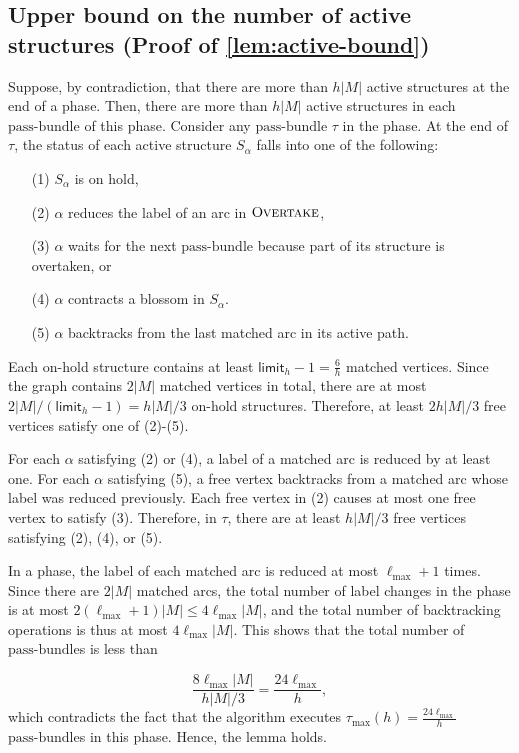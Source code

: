 \documentclass{article}
\newcommand{\alp}{\alpha}
\newcommand{\lmax}{\ell_{\max}}
\newcommand{\taumax}{\tau_{\max}}
\newcommand{\bundle}{\text{pass-bundle}\xspace}
\newcommand{\limit}{\mathsf{limit}}
\newcommand{\algOvertake}{\textsc{Overtake}\xspace}
\begin{document}
\subsection{Upper bound on the number of active structures (Proof of \cref{lem:active-bound})}
\label{sec:proof-active-bound}
Suppose, by contradiction, that there are more than $h|M|$ active structures at the end of a phase.
Then, there are more than $h|M|$ active structures in each $\bundle$ of this phase.
Consider any $\bundle$ $\tau$ in the phase.
At the end of $\tau$, the status of each active structure $S_\alp$ falls into one of the following:
\begin{itemize}
    \item[(1)] $S_\alp$ is on hold,
    \item[(2)] $\alp$ reduces the label of an arc in $\algOvertake$,
    \item[(3)] $\alp$ waits for the next $\bundle$ because part of its structure is overtaken, or
    \item[(4)] $\alp$ contracts a blossom in $S_\alp$.
    \item[(5)] $\alp$ backtracks from the last matched arc in its active path.
\end{itemize}
Each on-hold structure contains at least $\limit_h - 1 = \frac{6}{h}$ matched vertices.
Since the graph contains $2|M|$ matched vertices in total, there are at most $2|M|/(\limit_h - 1) = h|M|/3$ on-hold structures.
Therefore, at least $2h|M|/3$ free vertices satisfy one of (2)-(5).

For each $\alp$ satisfying (2) or (4), a label of a matched arc is reduced by at least one.
For each $\alp$ satisfying (5), a free vertex backtracks from a matched arc whose label was reduced previously.
Each free vertex in (2) causes at most one free vertex to satisfy (3).
Therefore, in $\tau$, there are at least $h|M|/3$ free vertices satisfying (2), (4), or (5).

In a phase, the label of each matched arc is reduced at most $\lmax + 1$ times.
Since there are $2|M|$ matched arcs, the total number of label changes in the phase is at most $2 (\lmax + 1) |M| \leq 4 \lmax |M|$, and the total number of backtracking operations is thus at most $4 \lmax |M|$.
This shows that the total number of $\bundle$s is less than

\[ \frac{8 \lmax |M|}{h|M| / 3} = \frac{24 \lmax}{h}, \]
which contradicts the fact that the algorithm executes $\taumax(h) = \frac{24 \lmax}{h}$ $\bundle$s in this phase. Hence, the lemma holds.
\end{document}
